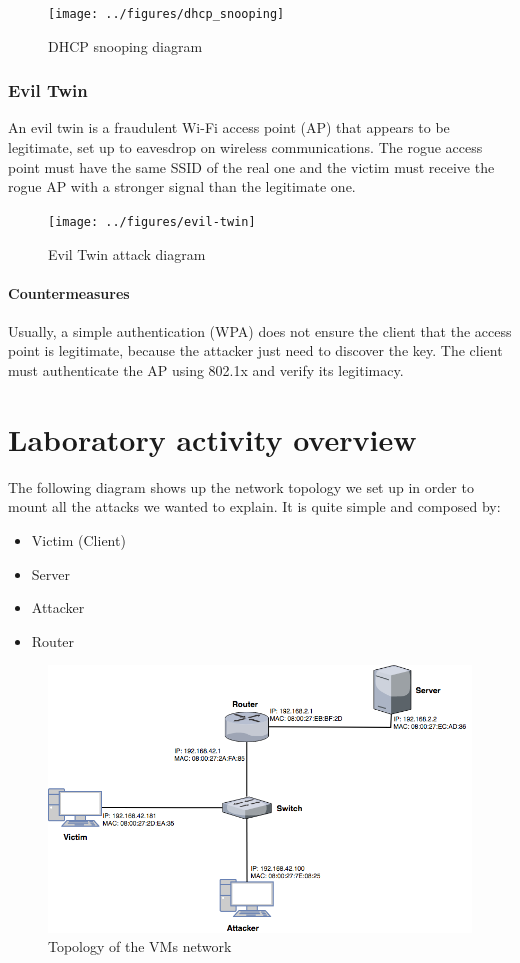 \documentclass[draft]{article}
\begin{document}
\begin{figure}[h]
\center
\texttt{[image: ../figures/dhcp\_snooping]}
\caption{DHCP snooping diagram}
\end{figure}

\subsubsection{Evil Twin}
An evil twin is a fraudulent Wi-Fi access point (AP) that appears to be legitimate, set up to eavesdrop on wireless communications.
The rogue access point must have the same \ac{SSID} of the real one and the victim must receive the rogue AP with a stronger signal than the legitimate one.

\begin{figure}[h]
  \center
  \texttt{[image: ../figures/evil-twin]}
  \caption{Evil Twin attack diagram}
\end{figure}
\paragraph{Countermeasures}
Usually, a simple authentication (WPA) does not ensure the client that the access point is legitimate, because the attacker just need to discover the key.
The client must authenticate the AP using 802.1x and verify its legitimacy.

\section{Laboratory activity overview}
The following diagram shows up the network topology we set up in order to mount all the attacks we wanted to explain. It is quite simple and composed by:
\begin{itemize}
  \item Victim (Client)
  \item Server
  \item Attacker
  \item Router
\end{itemize}


\begin{figure}[h]
  \center
  \includegraphics[width=.8\textwidth]{../figures/net_topo}
  \caption{Topology of the VMs network}
\end{figure}
\end{document}
